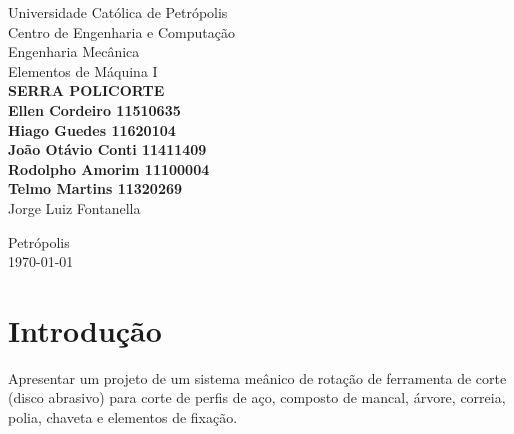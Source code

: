 \documentclass[a4paper, 11pt]{article}
\begin{document}

\begin{titlepage} %
\begin{center} %
{\large Universidade Cat\'olica de Petr\'opolis}\\[0.1cm] %
{\large Centro de Engenharia e Computa\c{c}\~ao}\\[0.1cm] %
{\large Engenharia Mec\^anica}\\[0.1cm]
{\large Elementos de M\'aquina I}\\[5.1cm]
{\bf \huge SERRA POLICORTE}\\[3.1cm] %
{\bf \large Ellen Cordeiro 11510635\\
Hiago Guedes 11620104\\
Jo\~ao Ot\'avio Conti 11411409\\
Rodolpho Amorim 11100004\\
Telmo Martins 11320269}\\[2.9cm] %
{\large Jorge Luiz Fontanella }\\[2.9cm]
\end{center} %

\begin{center}
{\large Petr\'opolis}\\[0.2cm]
{\large \today}
\end{center}
\end{titlepage} %

\newpage
\newpage
\tableofcontents
\thispagestyle{empty}

\newpage
{}
\section{Introdu\c{c}\~ao}
Apresentar um projeto de um sistema me\^anico de rota\c{c}\~ao de ferramenta
de corte (disco abrasivo) para corte de perfis de a\c{c}o, composto de mancal, \'arvore,
correia, polia, chaveta e elementos de fixa\c{c}\~ao.
\end{document}
